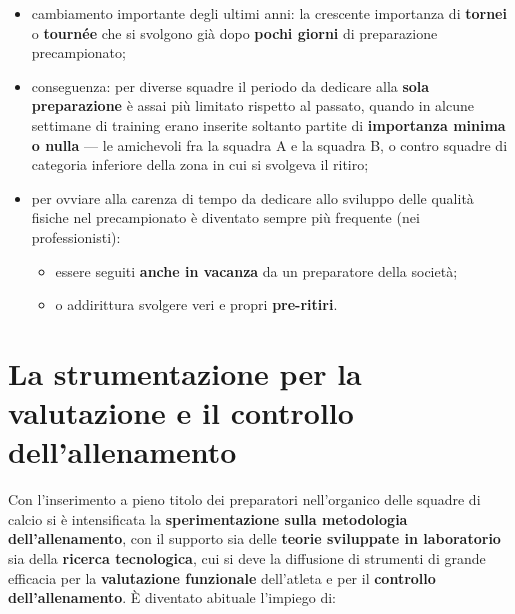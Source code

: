 \begin{itemize}
  \item cambiamento importante degli ultimi anni: la crescente importanza di \textbf{tornei} o
    \textbf{tournée} che si svolgono già dopo \textbf{pochi giorni} di preparazione precampionato;
  \item conseguenza: per diverse squadre il periodo da dedicare alla \textbf{sola preparazione} è
    assai più limitato rispetto al passato, quando in alcune settimane di training erano inserite
    soltanto partite di \textbf{importanza minima o nulla} --- le amichevoli fra la squadra A e la
    squadra B, o contro squadre di categoria inferiore della zona in cui si svolgeva il ritiro;
  \item per ovviare alla carenza di tempo da dedicare allo sviluppo delle qualità fisiche nel
    precampionato è diventato sempre più frequente (nei professionisti):
    \begin{itemize}
      \item essere seguiti \textbf{anche in vacanza} da un preparatore della società;
      \item o addirittura svolgere veri e propri \textbf{pre-ritiri}.
    \end{itemize}
\end{itemize}

\section{La strumentazione per la valutazione e il controllo dell'allenamento}

Con l'inserimento a pieno titolo dei preparatori nell'organico delle squadre di calcio si è
intensificata la \textbf{sperimentazione sulla metodologia dell'allenamento}, con il supporto sia
delle \textbf{teorie sviluppate in laboratorio} sia della \textbf{ricerca tecnologica}, cui si deve
la diffusione di strumenti di grande efficacia per la \textbf{valutazione funzionale} dell'atleta e
per il \textbf{controllo dell'allenamento}. È diventato abituale l'impiego di:

